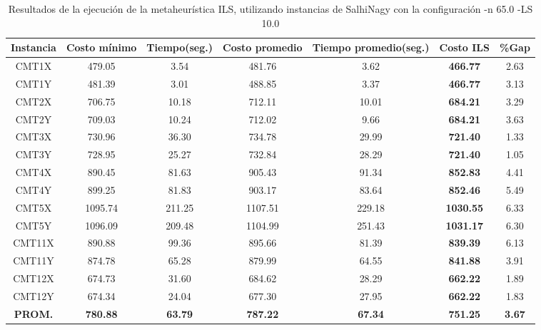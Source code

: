 \begin{table}[ht]
\caption{Resultados de la ejecución de la metaheurística ILS, utilizando instancias de SalhiNagy con la configuración -n 65.0 -LS 10.0}
\centering
\small
\begin{tabular}{c c c c c c c}
\hline\hline
Instancia & Costo mínimo & Tiempo(seg.) & Costo promedio & Tiempo promedio(seg.) & Costo ILS & \%Gap \\ [0.5ex]
\hline
CMT1X & 479.05 & 3.54 & 
481.76 & 3.62 & \bf{466.77} & 
2.63\\CMT1Y & 481.39 & 3.01 & 
488.85 & 3.37 & \bf{466.77} & 
3.13\\CMT2X & 706.75 & 10.18 & 
712.11 & 10.01 & \bf{684.21} & 
3.29\\CMT2Y & 709.03 & 10.24 & 
712.02 & 9.66 & \bf{684.21} & 
3.63\\CMT3X & 730.96 & 36.30 & 
734.78 & 29.99 & \bf{721.40} & 
1.33\\CMT3Y & 728.95 & 25.27 & 
732.84 & 28.29 & \bf{721.40} & 
1.05\\CMT4X & 890.45 & 81.63 & 
905.43 & 91.34 & \bf{852.83} & 
4.41\\CMT4Y & 899.25 & 81.83 & 
903.17 & 83.64 & \bf{852.46} & 
5.49\\CMT5X & 1095.74 & 211.25 & 
1107.51 & 229.18 & \bf{1030.55} & 
6.33\\CMT5Y & 1096.09 & 209.48 & 
1104.99 & 251.43 & \bf{1031.17} & 
6.30\\CMT11X & 890.88 & 99.36 & 
895.66 & 81.39 & \bf{839.39} & 
6.13\\CMT11Y & 874.78 & 65.28 & 
879.99 & 64.55 & \bf{841.88} & 
3.91\\CMT12X & 674.73 & 31.60 & 
684.62 & 28.29 & \bf{662.22} & 
1.89\\CMT12Y & 674.34 & 24.04 & 
677.30 & 27.95 & \bf{662.22} & 
1.83\\\bf{PROM.} & 
\bf{780.88} & \bf{63.79} & \bf{787.22} & \bf{67.34} & \bf{751.25} & \bf{3.67}\\[1ex]\hline
\end{tabular}
\label{table:nonlin}
\end{table} \clearpage
